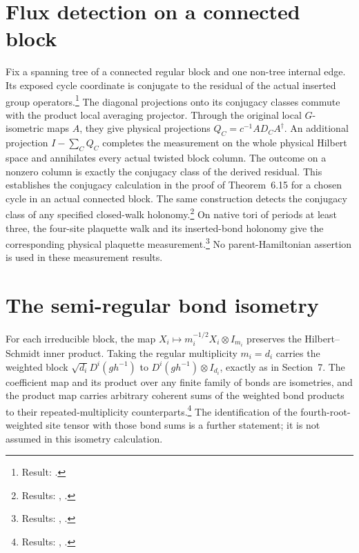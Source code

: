 \documentclass{article}
\begin{document}
\section{Flux detection on a connected block}
Fix a spanning tree of a connected regular block and one non-tree
internal edge. Its exposed cycle coordinate is conjugate to the residual
of the actual inserted group operators.\footnote{Result:
    .}
The diagonal projections onto
its conjugacy classes commute with the product local averaging
projector. Through the original local $G$-isometric maps $A$, they give
physical projections $Q_C=c^{-1}AD_CA^\dagger$.
An additional projection $I-\sum_C Q_C$ completes the measurement on
the whole physical Hilbert space and annihilates every actual twisted
block column. The outcome on a nonzero column is exactly the conjugacy
class of the derived residual. This establishes the conjugacy
calculation in the proof of Theorem~6.15 for a chosen cycle in an actual
connected block. The same construction detects the conjugacy class of
any specified closed-walk holonomy.\footnote{Results:
    ,
    .}
On native tori of periods at least three, the four-site plaquette
walk and its inserted-bond holonomy give the corresponding physical
plaquette measurement.\footnote{Results:
    ,
    .}
No parent-Hamiltonian assertion is used in these measurement results.

\section{The semi-regular bond isometry}
For each irreducible block, the map
$X_i\mapsto m_i^{-1/2}X_i\otimes I_{m_i}$ preserves the
Hilbert--Schmidt inner product. Taking the regular multiplicity
$m_i=d_i$ carries the weighted block
$\sqrt{d_i}D^i(gh^{-1})$ to $D^i(gh^{-1})\otimes I_{d_i}$,
exactly as in Section~7. The coefficient map and its product over any
finite family of bonds are isometries, and the product map carries
arbitrary coherent sums of the weighted bond products to their
repeated-multiplicity counterparts.\footnote{Results:
    ,
    .}
The identification of the
fourth-root-weighted site tensor with those bond sums is a further
statement; it is not assumed in this isometry calculation.
\end{document}
